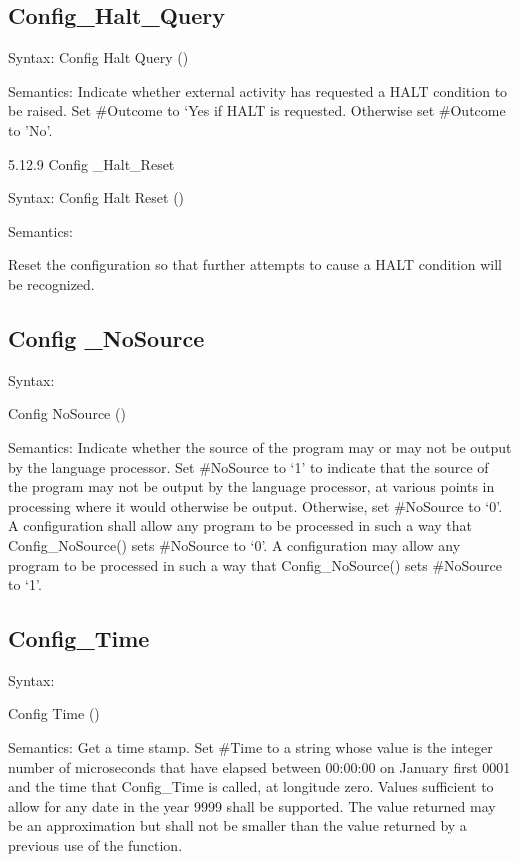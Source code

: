 \subsection{Config\_Halt\_Query}\label{config_halt_query}

Syntax: Config Halt Query ()

Semantics: Indicate whether external activity has requested a HALT
condition to be raised. Set \#Outcome to `Yes if HALT is requested.
Otherwise set \#Outcome to 'No'.

5.12.9 Config \_Halt\_Reset

Syntax: Config Halt Reset ()

Semantics:

Reset the configuration so that further attempts to cause a HALT
condition will be recognized.

\subsection{Config \_NoSource}\label{config-_nosource}

Syntax:

Config NoSource ()

Semantics: Indicate whether the source of the program may or may not be
output by the language processor. Set \#NoSource to `1' to indicate that
the source of the program may not be output by the language processor,
at various points in processing where it would otherwise be output.
Otherwise, set \#NoSource to `0'. A configuration shall allow any
program to be processed in such a way that Config\_NoSource() sets
\#NoSource to `0'. A configuration may allow any program to be processed
in such a way that Config\_NoSource() sets \#NoSource to `1'.

\subsection{Config\_Time}\label{config_time}

Syntax:

Config Time ()

Semantics: Get a time stamp. Set \#Time to a string whose value is the
integer number of microseconds that have elapsed between 00:00:00 on
January first 0001 and the time that Config\_Time is called, at
longitude zero. Values sufficient to allow for any date in the year 9999
shall be supported. The value returned may be an approximation but shall
not be smaller than the value returned by a previous use of the
function.

